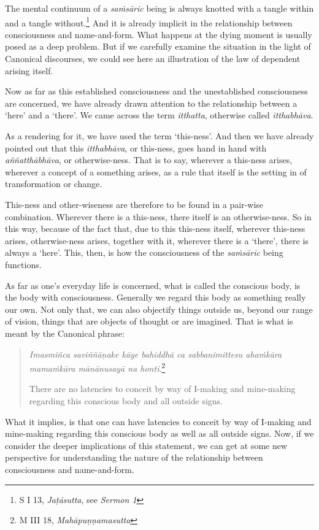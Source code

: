 The mental continuum of a \emph{saṁsāric} being is always knotted with a tangle within and a tangle without.\footnote{S I 13, \emph{Jaṭāsutta}, see \emph{Sermon 1}} And it is already implicit in the relationship between consciousness and name-and-form. What happens at the dying moment is usually posed as a deep problem. But if we carefully examine the situation in the light of Canonical discourses, we could see here an illustration of the law of dependent arising itself.

Now as far as this established consciousness and the unestablished consciousness are concerned, we have already drawn attention to the relationship between a `here' and a `there'. We came across the term \emph{itthatta}, otherwise called \emph{itthabhāva}.

As a rendering for it, we have used the term `this-ness'. And then we have already pointed out that this \emph{itthabhāva}, or this-ness, goes hand in hand with \emph{aññatthābhāva}, or otherwise-ness. That is to say, wherever a this-ness arises, wherever a concept of a something arises, as a rule that itself is the setting in of transformation or change.

This-ness and other-wiseness are therefore to be found in a pair-wise combination. Wherever there is a this-ness, there itself is an otherwise-ness. So in this way, because of the fact that, due to this this-ness itself, wherever this-ness arises, otherwise-ness arises, together with it, wherever there is a `there', there is always a `here'. This, then, is how the consciousness of the \emph{saṁsāric} being functions.

As far as one's everyday life is concerned, what is called the conscious body, is the body with consciousness. Generally we regard this body as something really our own. Not only that, we can also objectify things outside us, beyond our range of vision, things that are objects of thought or are imagined. That is what is meant by the Canonical phrase:

\begin{quote}
\emph{Imasmiñca saviññāṇake kāye bahiddhā ca sabbanimittesu ahaṁkāra mamaṁkāra mānānusayā na honti}.\footnote{M III 18, \emph{Mahāpuṇṇamasutta}}

There are no latencies to conceit by way of I-making and mine-making regarding this conscious body and all outside signs.
\end{quote}

What it implies, is that one can have latencies to conceit by way of I-making and mine-making regarding this conscious body as well as all outside signs. Now, if we consider the deeper implications of this statement, we can get at some new perspective for understanding the nature of the relationship between consciousness and name-and-form.

